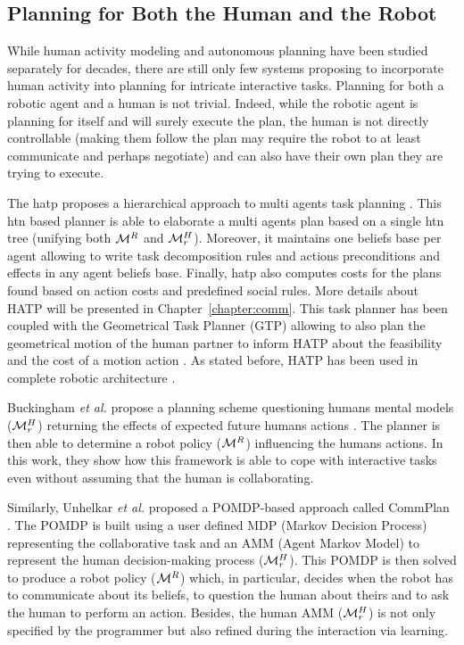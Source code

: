 \documentclass[a4paper,11pt,twoside]{StyleThese}
\begin{document}
\subsection{Planning for Both the Human and the Robot}
While human activity modeling and autonomous planning have been studied separately for decades, there are still only few systems proposing to incorporate human activity into planning for intricate interactive tasks.
Planning for both a robotic agent and a human is not trivial. Indeed, while the robotic agent is planning for itself and will surely execute the plan, the human is not directly controllable (making them follow the plan may require the robot to at least communicate and perhaps negotiate) and can also have their own plan they are trying to execute.

The \acrfull{hatp} proposes a hierarchical approach to multi agents task planning \cite{alili2009task, lallement2014hatp}. This \acrshort{htn} based planner is able to elaborate a multi agents plan based on a single \acrshort{htn} tree (unifying both $\mathcal{M}^R$ and $\mathcal{M}^H_r$). Moreover, it maintains one beliefs base per agent allowing to write task decomposition rules and actions preconditions and effects in any agent beliefs base. Finally, \acrshort{hatp} also computes costs for the plans found based on action costs and predefined social rules. More details about HATP will be presented in Chapter~\ref{chapter:comm}. This task planner has been coupled with the Geometrical Task Planner (GTP) allowing to also plan the geometrical motion of the human partner to inform HATP about the feasibility and the cost of a motion action \cite{gharbi2015combining}. As stated before, HATP has been used in complete robotic architecture \cite{devin2016implemented, lemaignan2017artificial}.

Buckingham \textit{et al.} propose a planning scheme questioning humans mental models ($\mathcal{M}^H_r$) returning the effects of expected future humans actions \cite{buckingham2020robot}. The planner is then able to determine a robot policy ($\mathcal{M}^R$) influencing the humans actions. In this work, they show how this framework is able to cope with interactive tasks even without assuming that the human is collaborating.

Similarly, Unhelkar \textit{et al.} proposed a POMDP-based approach called CommPlan \cite{unhelkar2020decision}. The POMDP is built using a user defined MDP (Markov Decision Process) representing the collaborative task and an AMM (Agent Markov Model) to represent the human decision-making process ($\mathcal{M}^H_r$). This POMDP is then solved to produce a robot policy ($\mathcal{M}^R$) which, in particular, decides when the robot has to communicate about its beliefs, to question the human about theirs and to ask the human to perform an action. Besides, the human AMM ($\mathcal{M}^H_r$) is not only specified by the programmer but also refined during the interaction via learning.
\end{document}
